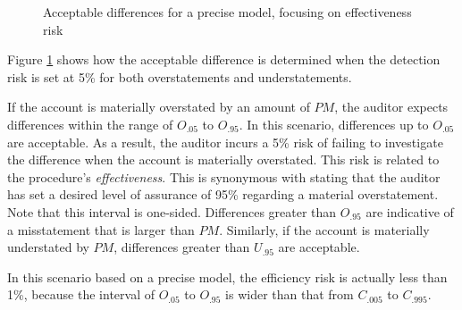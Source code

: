 \documentclass[12pt,a4paper]{memoir}
\begin{document}
\begin{figure}[thbp]
\begin{center}
\caption{Acceptable differences for a precise model, focusing on effec\-tiveness risk}

\label{fig:method_detection_precise}
\end{center}
\end{figure}

Figure \ref{fig:method_detection_precise}\label{mar:controlling_effectiveness_risk} shows how the acceptable difference is determined when the detection risk is set at 5\% for both overstatements and understatements. 

If the account is materially overstated by an amount of $PM$, the auditor expects differences within the range of $O_{.05}$ to $O_{.95}$. In this scenario, differences up to $O_{.05}$ are acceptable. As a result, the auditor incurs a 5\% risk of failing to investigate the difference when the account is materially overstated. This risk is related to the procedure's \emph{effectiveness}. This is synonymous with stating that the auditor has set a desired level of assurance of 95\% regarding a material overstatement. Note that this interval is one-sided. Differences greater than $O_{.95}$ are indicative of a misstatement that is larger than $PM$. Similarly, if the account is materially understated by $PM$, differences greater than $U_{.95}$ are acceptable. 

In this scenario based on a precise model, the efficiency risk is actually less than 1\%, because the interval of $O_{.05}$ to $O_{.95}$ is wider than that from $C_{.005}$ to $C_{.995}$.
\end{document}
